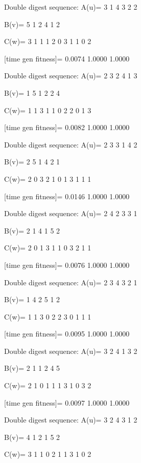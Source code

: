 Double digest sequence:
A(u)=
     3     1     4     3     2     2

B(v)=
     5     1     2     4     1     2

C(w)=
     3     1     1     1     2     0     3     1     1     0     2

[time gen fitness]=
    0.0074    1.0000    1.0000

Double digest sequence:
A(u)=
     2     3     2     4     1     3

B(v)=
     1     5     1     2     2     4

C(w)=
     1     1     3     1     1     0     2     2     0     1     3

[time gen fitness]=
    0.0082    1.0000    1.0000

Double digest sequence:
A(u)=
     2     3     3     1     4     2

B(v)=
     2     5     1     4     2     1

C(w)=
     2     0     3     2     1     0     1     3     1     1     1

[time gen fitness]=
    0.0146    1.0000    1.0000

Double digest sequence:
A(u)=
     2     4     2     3     3     1

B(v)=
     2     1     4     1     5     2

C(w)=
     2     0     1     3     1     1     0     3     2     1     1

[time gen fitness]=
    0.0076    1.0000    1.0000

Double digest sequence:
A(u)=
     2     3     4     3     2     1

B(v)=
     1     4     2     5     1     2

C(w)=
     1     1     3     0     2     2     3     0     1     1     1

[time gen fitness]=
    0.0095    1.0000    1.0000

Double digest sequence:
A(u)=
     3     2     4     1     3     2

B(v)=
     2     1     1     2     4     5

C(w)=
     2     1     0     1     1     1     3     1     0     3     2

[time gen fitness]=
    0.0097    1.0000    1.0000

Double digest sequence:
A(u)=
     3     2     4     3     1     2

B(v)=
     4     1     2     1     5     2

C(w)=
     3     1     1     0     2     1     1     3     1     0     2

